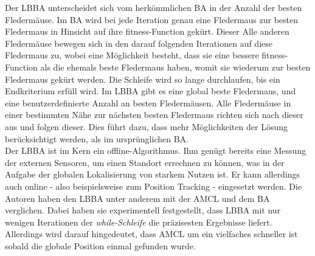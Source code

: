Der LBBA unterscheidet sich vom herkömmlichen BA in der Anzahl der besten Fledermäuse. Im BA wird bei jede Iteration genau eine Fledermaus zur besten Fledermaus in Hinsicht auf ihre fitness-Function gekürt. Dieser Alle anderen Fledermäuse bewegen sich in den darauf folgenden Iterationen auf diese Fledermaus zu, wobei eine Möglichkeit besteht, dass sie eine bessere fitness-Function als die ehemals beste Fledermaus haben, womit sie wiederum zur besten Fledermaus gekürt werden. Die Schleife wird so lange durchlaufen, bis ein Endkriterium erfüll wird. Im LBBA gibt es eine global beste Fledermaus, und eine benutzerdefinierte Anzahl an besten Fledermäusen. Alle Fledermäuse in einer bestimmten Nähe zur nächsten besten Fledermaus richten sich nach dieser aus und folgen dieser. Dies führt dazu, dass mehr Möglichkeiten der Lösung berücksichtigt werden, als im ursprünglichen BA.\\
Der LBBA ist im Kern ein offline-Algorithmus. Ihm genügt bereits eine Messung der externen Sensoren, um einen Standort errechnen zu können, was in der Aufgabe der globalen Lokalisierung von starkem Nutzen ist. Er kann allerdings auch online - also beispielsweise zum Position Tracking - eingesetzt werden. Die Autoren haben den LBBA unter anderem mit der AMCL und dem BA verglichen. Dabei haben sie experimentell festgestellt, dass LBBA mit nur wenigen Iterationen der \textit{while-Schleife} die präzisesten Ergebnisse liefert. Allerdings wird darauf hingedeutet, dass AMCL um ein vielfaches schneller ist sobald die globale Position einmal gefunden wurde.
